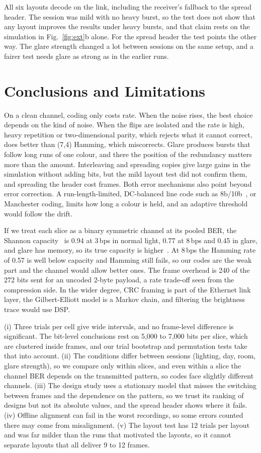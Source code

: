 \documentclass[conference,a4paper]{IEEEtran}
\begin{document}
All six layouts decode on the link, including the receiver's
fallback to the spread header. The session was mild with no heavy burst, so the test does not show
that any layout improves the results under heavy bursts, and that claim rests on the simulation in
Fig.~\ref{fig:ext}b alone. For the spread header the test points the other way. The glare strength
changed a lot between sessions on the same setup, and a fairer test needs glare as strong as in the
earlier runs.

\section{Conclusions and Limitations}
On a clean channel, coding only costs rate. When the noise rises, the best choice depends on the kind of noise. When the flips are isolated and the rate is high, heavy repetition or two-dimensional parity,
which rejects what it cannot correct, does better than (7,4) Hamming, which miscorrects. Glare produces bursts that follow long runs of one
colour, and there the position of the redundancy matters more than the amount. Interleaving and
spreading copies give large gains in the simulation without adding bits, but the mild layout test did not confirm them, and spreading the header cost frames. Both error mechanisms also point beyond
error correction. A run-length-limited, DC-balanced line code such as 8b/10b~\cite{widmer}, or
Manchester coding, limits how long a colour is held, and an adaptive threshold would follow the
drift.

If we treat each slice as a binary symmetric channel at its pooled BER, the
Shannon capacity~\cite{shannon} is 0.94 at 3\,bps in normal light, 0.77 at 8\,bps and 0.45 in
glare, and glare has memory, so its true capacity is higher~\cite{gilbert}. At 8\,bps the Hamming
rate of 0.57 is well below capacity and Hamming still fails, so our codes are the weak part and the
channel would allow better ones. The frame overhead is 240 of the 272 bits sent for an uncoded 2-byte payload, a rate trade-off seen from
the compression side. In the wider degree, CRC framing is part of the Ethernet
link layer, the Gilbert-Elliott model is a Markov chain, and filtering the brightness trace would
use DSP.

(i) Three trials per cell give wide intervals, and no
frame-level difference is significant. The bit-level conclusions rest on 5{,}000 to 7{,}000 bits per
slice, which are clustered inside frames, and our trial bootstrap and permutation tests take that
into account. (ii) The conditions differ between sessions (lighting, day, room, glare strength), so
we compare only within slices, and even within a slice the channel BER depends on the transmitted
pattern, so codes face slightly different channels. (iii) The design study uses a stationary model
that misses the switching between frames and the dependence on the pattern, so we trust its ranking
of designs but not its absolute values, and the spread header shows where it fails. (iv) Offline
alignment can fail in the worst recordings, so some errors counted there may come from
misalignment. (v) The layout test has 12 trials per layout and was far milder than the runs that
motivated the layouts, so it cannot separate layouts that all deliver 9 to 12 frames.
\end{document}
